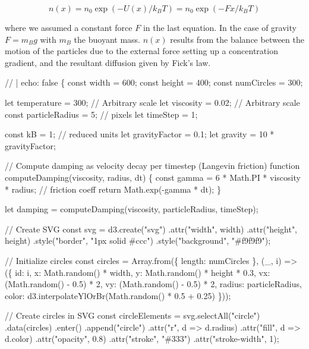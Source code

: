 \documentclass[
  letterpaper,
  enabledeprecatedfontcommands]{report}
\newenvironment{Shaded}{\begin{snugshade}}{\end{snugshade}}
\newcommand{\NormalTok}[1]{\textcolor[rgb]{0.00,0.23,0.31}{#1}}
\begin{document}
\[
n(x)=n_{0} \exp \left(-U(x) / k_{B} T\right)=n_{0} \exp \left(-F x / k_{B} T\right)
\]

where we assumed a constant force \(F\) in the last equation. In the
case of gravity \(F=m_{B} g\) with \(m_{B}\) the buoyant mass. \(n(x)\)
results from the balance between the motion of the particles due to the
external force setting up a concentration gradient, and the resultant
diffusion given by Fick's law.

\begin{Shaded}
\begin{Highlighting}[]
\NormalTok{// | echo: false}
\NormalTok{\{}
\NormalTok{  const width = 600;}
\NormalTok{const height = 400;}
\NormalTok{const numCircles = 300;}

\NormalTok{let temperature = 300;    // Arbitrary scale}
\NormalTok{let viscosity = 0.02;     // Arbitrary scale}
\NormalTok{const particleRadius = 5; // pixels}
\NormalTok{let timeStep = 1;}

\NormalTok{const kB = 1; // reduced units}
\NormalTok{let gravityFactor = 0.1;}
\NormalTok{let gravity = 10 * gravityFactor;}

\NormalTok{// Compute damping as velocity decay per timestep (Langevin friction)}
\NormalTok{function computeDamping(viscosity, radius, dt) \{}
\NormalTok{  const gamma = 6 * Math.PI * viscosity * radius; // friction coeff}
\NormalTok{  return Math.exp({-}gamma * dt);}
\NormalTok{\}}

\NormalTok{let damping = computeDamping(viscosity, particleRadius, timeStep);}

\NormalTok{// Create SVG}
\NormalTok{const svg = d3.create("svg")}
\NormalTok{  .attr("width", width)}
\NormalTok{  .attr("height", height)}
\NormalTok{  .style("border", "1px solid \#ccc")}
\NormalTok{  .style("background", "\#f9f9f9");}

\NormalTok{// Initialize circles}
\NormalTok{const circles = Array.from(\{ length: numCircles \}, (\_, i) =\textgreater{} (\{}
\NormalTok{  id: i,}
\NormalTok{  x: Math.random() * width,}
\NormalTok{  y: Math.random() * height * 0.3,}
\NormalTok{  vx: (Math.random() {-} 0.5) * 2,}
\NormalTok{  vy: (Math.random() {-} 0.5) * 2,}
\NormalTok{  radius: particleRadius,}
\NormalTok{  color: d3.interpolateYlOrBr(Math.random() * 0.5 + 0.25)}
\NormalTok{\}));}

\NormalTok{// Create circles in SVG}
\NormalTok{const circleElements = svg.selectAll("circle")}
\NormalTok{  .data(circles)}
\NormalTok{  .enter()}
\NormalTok{  .append("circle")}
\NormalTok{  .attr("r", d =\textgreater{} d.radius)}
\NormalTok{  .attr("fill", d =\textgreater{} d.color)}
\NormalTok{  .attr("opacity", 0.8)}
\NormalTok{  .attr("stroke", "\#333")}
\NormalTok{  .attr("stroke{-}width", 1);}


\end{Highlighting}
\end{Shaded}
\end{document}
